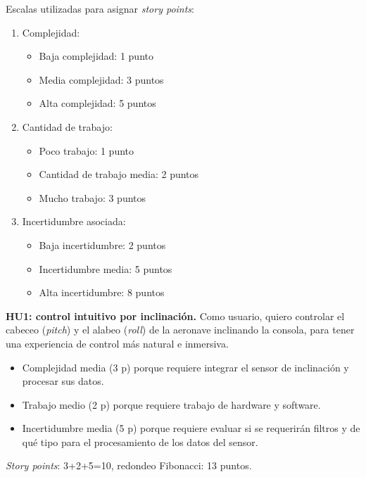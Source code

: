 \documentclass[
11pt, %
]{charter}
\begin{document}
Escalas utilizadas para asignar \textit{story points}:
\begin{enumerate}
	\item Complejidad:
	\begin{itemize}
		\item Baja complejidad: 1 punto
		\item Media complejidad: 3 puntos
		\item Alta complejidad: 5 puntos
	\end{itemize}
	\item Cantidad de trabajo:
	\begin{itemize}
		\item Poco trabajo: 1 punto
		\item Cantidad de trabajo media: 2 puntos
		\item Mucho trabajo: 3 puntos
	\end{itemize}
	\item Incertidumbre asociada:
	\begin{itemize}
		\item  Baja incertidumbre: 2 puntos
		\item  Incertidumbre media: 5 puntos
		\item  Alta incertidumbre: 8 puntos
	\end{itemize}
\end{enumerate}


	\textbf{HU1: control intuitivo por inclinación.} Como usuario, quiero controlar el cabeceo (\textit{pitch}) y el alabeo (\textit{roll}) de la aeronave inclinando la consola, para tener una experiencia de control más natural e inmersiva.

	\begin{itemize}
		\item Complejidad media (3 p) porque requiere integrar el sensor de inclinación y procesar sus datos.
		\item Trabajo medio (2 p) porque requiere trabajo de hardware y software. 
		\item Incertidumbre media (5 p) porque requiere evaluar si se requerirán filtros y de qué tipo para el procesamiento de los datos del sensor. 
	\end{itemize}
	\textit{Story points}: 3+2+5=10, redondeo Fibonacci: 13 puntos.
\end{document}
